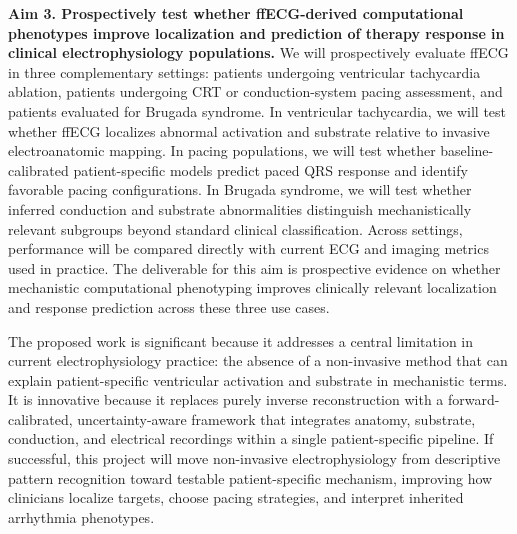 \documentclass[letterpaper]{article}
\begin{document}
\textbf{Aim 3. Prospectively test whether ffECG-derived computational phenotypes improve localization and prediction of therapy response in clinical electrophysiology populations.} We will prospectively evaluate ffECG in three complementary settings: patients undergoing ventricular tachycardia ablation, patients undergoing CRT or conduction-system pacing assessment, and patients evaluated for Brugada syndrome. In ventricular tachycardia, we will test whether ffECG localizes abnormal activation and substrate relative to invasive electroanatomic mapping. In pacing populations, we will test whether baseline-calibrated patient-specific models predict paced QRS response and identify favorable pacing configurations. In Brugada syndrome, we will test whether inferred conduction and substrate abnormalities distinguish mechanistically relevant subgroups beyond standard clinical classification. Across settings, performance will be compared directly with current ECG and imaging metrics used in practice. The deliverable for this aim is prospective evidence on whether mechanistic computational phenotyping improves clinically relevant localization and response prediction across these three use cases.

The proposed work is significant because it addresses a central limitation in current electrophysiology practice: the absence of a non-invasive method that can explain patient-specific ventricular activation and substrate in mechanistic terms. It is innovative because it replaces purely inverse reconstruction with a forward-calibrated, uncertainty-aware framework that integrates anatomy, substrate, conduction, and electrical recordings within a single patient-specific pipeline. If successful, this project will move non-invasive electrophysiology from descriptive pattern recognition toward testable patient-specific mechanism, improving how clinicians localize targets, choose pacing strategies, and interpret inherited arrhythmia phenotypes.





\end{document}
